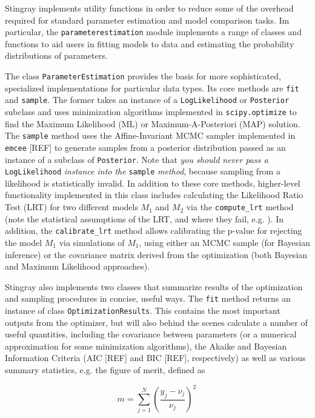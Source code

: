 \documentclass[12pt]{emulateapj}
\begin{document}
Stingray implements utility functions in order to reduce some of the overhead required for standard parameter estimation and model comparison tasks. Im particular, the \verb|parameterestimation| module implements a range of classes and functions to aid users in fitting models to data and estimating the probability distributions of parameters.

The class \verb|ParameterEstimation| provides the basis for more sophisticated, specialized implementations for particular data types. Its core methods are \verb|fit| and \verb|sample|. The former takes an instance of a \verb|LogLikelihood| or \verb|Posterior| subclass and uses minimization algorithms implemented in \verb|scipy.optimize| to find the Maximum Likelihood (ML) or Maximum-A-Posteriori (MAP) solution. The \verb|sample| method uses the Affine-Invariant MCMC sampler implemented in \verb|emcee| [REF] to generate samples from a posterior distribution passed as an instance of a subclass of \verb|Posterior|. Note that \textit{you should never pass a} \verb|LogLikelihood| \textit{instance into the} \verb|sample| \textit{method}, because sampling from a likelihood is statistically invalid. In addition to these core methods, higher-level functionality implemented in this class includes calculating the Likelihood Ratio Test (LRT) for two different models $M_1$ and $M_2$ via the \verb|compute_lrt| method (note the statistical assumptions of the LRT, and where they fail, e.g. \citealt{protassov2002}). In addition, the \verb|calibrate_lrt| method allows calibrating the p-value for rejecting the model $M_1$ via simulations of $M_1$, using either an MCMC sample (for Bayesian inference) or the covariance matrix derived from the optimization (both Bayesian and Maximum Likelihood approaches).

Stingray also implements two classes that summarize results of the optimization and sampling procedures in concise, useful ways. The \verb|fit| method returns an instance of class \verb|OptimizationResults|. This contains the most important outputs from the optimizer, but will also behind the scenes calculate a number of useful quantities, including the covariance between parameters (or a numerical approximation for some minimization algorithms), the Akaike and Bayesian Information Criteria (AIC [REF] and BIC [REF], respectively) as well as various summary statistics, e.g. the figure of merit, defined as 

\[
m = \sum_{j=1}^{N}{\left( \frac{y_j - \nu_j}{\nu_j} \right)^2} \,
\]
\end{document}
